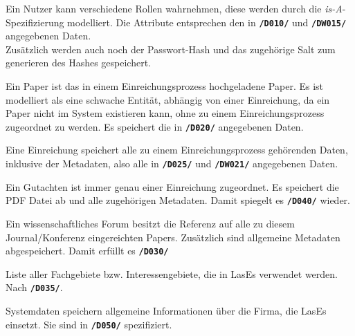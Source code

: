 \begin{description}
	 Ein Nutzer kann verschiedene Rollen wahrnehmen, diese werden durch die \emph{is-A}-Spezifizierung modelliert. Die Attribute entsprechen den in \texttt{\textbf{/D010/}} und \texttt{\textbf{/DW015/}} angegebenen Daten.\\Zusätzlich werden auch noch der Passwort-Hash und das zugehörige Salt zum generieren des Hashes gespeichert.

	 Ein Paper ist das in einem Einreichungsprozess hochgeladene Paper. Es ist modelliert als eine schwache Entität, abhängig von einer Einreichung, da ein Paper nicht im System existieren kann, ohne zu einem Einreichungsprozess zugeordnet zu werden. Es speichert die in \texttt{\textbf{/D020/}} angegebenen Daten.

	 Eine Einreichung speichert alle zu einem Einreichungsprozess gehörenden Daten, inklusive der Metadaten, also alle in \texttt{\textbf{/D025/}} und \texttt{\textbf{/DW021/}} angegebenen Daten.

	 Ein Gutachten ist immer genau einer Einreichung zugeordnet. Es speichert die PDF Datei ab und alle zugehörigen Metadaten.
	Damit spiegelt es \texttt{\textbf{/D040/}} wieder.

	 Ein wissenschaftliches Forum besitzt die Referenz auf alle zu diesem Journal/Konferenz eingereichten Papers. Zusätzlich sind allgemeine Metadaten abgespeichert. Damit erfüllt es \texttt{\textbf{/D030/}}

	 Liste aller Fachgebiete bzw. Interessengebiete, die in LasEs verwendet werden. Nach \texttt{\textbf{/D035/}}.

	 Systemdaten speichern allgemeine Informationen über die Firma, die LasEs einsetzt. Sie sind in \texttt{\textbf{/D050/}} spezifiziert.

\end{description}
